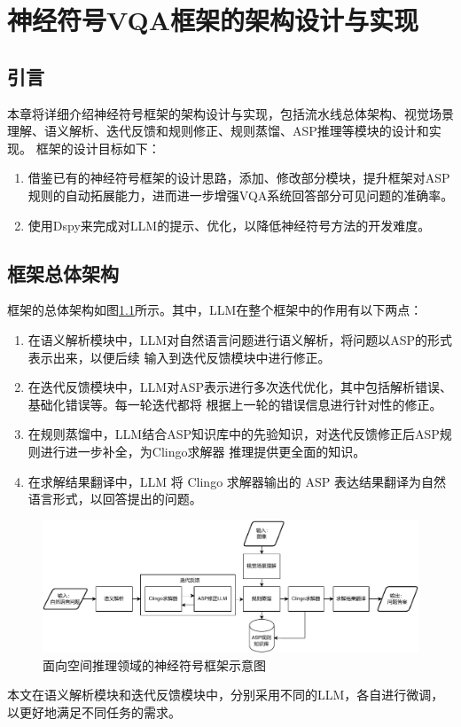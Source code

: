 \chapter{神经符号VQA框架的架构设计与实现}
\section{引言}
本章将详细介绍神经符号框架的架构设计与实现，包括流水线总体架构、视觉场景理解、语义解析、迭代反馈和规则修正、规则蒸馏、ASP推理等模块的设计和实现。
框架的设计目标如下：
\begin{enumerate}[label=(\arabic*),itemsep=0pt,parsep=0pt]
\item 借鉴已有的神经符号框架的设计思路，添加、修改部分模块，提升框架对ASP规则的自动拓展能力，进而进一步增强VQA系统回答部分可见问题的准确率。
\item 使用Dspy来完成对LLM的提示、优化，以降低神经符号方法的开发难度。
\end{enumerate}
\section{框架总体架构}
框架的总体架构如图\ref{fig:pipeline}所示。其中，LLM在整个框架中的作用有以下两点：
\begin{enumerate}[label=(\arabic*),itemsep=0pt,parsep=0pt]
    \item 在语义解析模块中，LLM对自然语言问题进行语义解析，将问题以ASP的形式表示出来，以便后续
输入到迭代反馈模块中进行修正。
    \item 在迭代反馈模块中，LLM对ASP表示进行多次迭代优化，其中包括解析错误、基础化错误等。每一轮迭代都将
根据上一轮的错误信息进行针对性的修正。
    \item 在规则蒸馏中，LLM结合ASP知识库中的先验知识，对迭代反馈修正后ASP规则进行进一步补全，为Clingo求解器
推理提供更全面的知识。
    \item 在求解结果翻译中，LLM 将 Clingo 求解器输出的 ASP 表达结果翻译为自然语言形式，以回答提出的问题。
\end{enumerate}
\begin{figure}
    \centering
    \includegraphics[width=\textwidth]{figures/pipeline-crop.pdf}
    \caption{面向空间推理领域的神经符号框架示意图}
    \label{fig:pipeline}
\end{figure}
本文在语义解析模块和迭代反馈模块中，分别采用不同的LLM，各自进行微调，以更好地满足不同任务的需求。
